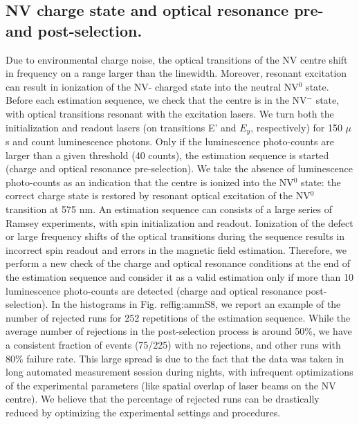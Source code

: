 \documentclass{report}
\begin{document}
\subsection{NV charge state and optical resonance pre- and post-selection.}
Due to environmental charge noise, the optical transitions of the NV centre shift in frequency on a range larger than the linewidth. Moreover, resonant excitation can result in ionization of the NV- charged state into the neutral NV$^0$ state.
Before each estimation sequence, we check that the centre is in the NV$^-$ state, with optical transitions resonant with the excitation lasers. We turn both the initialization and readout lasers (on transitions E’ and $E_y$, respectively) for 150 $\mu$s and count luminescence photons. Only if the luminescence photo-counts are larger than a given threshold (40 counts), the estimation sequence is started (charge and optical resonance pre-selection). We take the absence of luminescence photo-counts as an indication that the centre is ionized into the NV$^0$ state: the correct charge state is restored by resonant optical excitation of the NV$^0$ transition at 575 nm.
An estimation sequence can consists of a large series of Ramsey experiments, with spin initialization and readout. Ionization of the defect or large frequency shifts of the optical transitions during the sequence results in incorrect spin readout and errors in the magnetic field estimation. Therefore, we perform a new check of the charge and optical resonance conditions at the end of the estimation sequence and consider it as a valid estimation only if more than 10 luminescence photo-counts are detected (charge and optical resonance post-selection).
In the histograms in Fig. ref{fig:ammS8}, we report an example of the number of rejected runs for 252 repetitions of the estimation sequence. While the average number of rejections in the post-selection process is around 50\%, we have a consistent fraction of events (75/225) with no rejections, and other runs with 80\% failure rate. This large spread is due to the fact that the data was taken in long automated measurement session during nights, with infrequent optimizations of the experimental parameters (like spatial overlap of laser beams on the NV centre). We believe that the percentage of rejected runs can be drastically reduced by optimizing the experimental settings and procedures.
\end{document}
